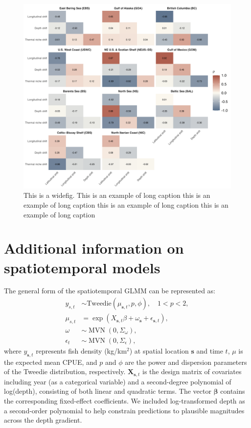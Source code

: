 \documentclass[lineno,pdflatex,sn-nature]{sn-jnl}%
\begin{document}
\begin{appendices}
\begin{figure}[h]
\centering
\includegraphics[width=1\textwidth]{output/figures/supp/corr_supp.png}
\caption{This is a widefig. This is an example of long caption this is an example of long caption  this is an example of long caption this is an example of long caption}\label{fig:corr_supp}
\end{figure}

\section{Additional information on spatiotemporal models}\label{Appendix B}
    
The general form of the spatiotemporal GLMM can be represented as:
\begin{align}
    y_{s,t} &\sim \text{Tweedie} \left( \mu_{\boldsymbol{s},t}, p, \phi \right), \quad 1 < p < 2, \label{eq:1} \\
    \mu_{s,t} &= \exp \left( X_{\boldsymbol{s},t} \beta + \omega_{\boldsymbol{s}} + \epsilon_{\boldsymbol{s},t} \right), \label{eq:2} \\
    \omega &\sim \operatorname{MVN} \left(0, \Sigma_{\omega} \right), \label{eq:3} \\
    \epsilon_{t} &\sim \operatorname{MVN} \left(0, \Sigma_{\epsilon} \right), \label{eq:4}
\end{align}
where \( y_{\mathbf{s},t} \) represents fish density (kg/km\(^2\)) at spatial location \( \mathbf{s} \) and time \( t \), \( \mu \) is the expected mean CPUE, and \( p \) and \( \phi \) are the power and dispersion parameters of the Tweedie distribution, respectively. \( \mathbf{X}_{\mathbf{s},t} \) is the design matrix of covariates including year (as a categorical variable) and a second-degree polynomial of log(depth), consisting of both linear and quadratic terms. The vector \( \bm{\beta} \) contains the corresponding fixed-effect coefficients.
We included log-transformed depth as a second-order polynomial to help constrain predictions to plausible magnitudes across the depth gradient.


\end{appendices}
\end{document}
